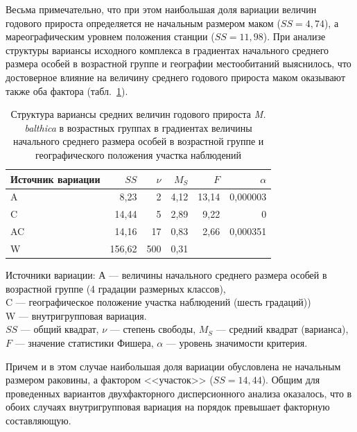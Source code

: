 Весьма примечательно, что при этом наибольшая доля вариации величин годового прироста определяется не начальным размером маком ($SS = 4,74$), а мареографическим уровнем положения станции ($SS = 11,98$).
При анализе структуры вариансы исходного комплекса в градиентах начального среднего размера особей в возрастной группе и географии местообитаний выяснилось, что достоверное влияние на величину среднего годового прироста маком оказывают также оба фактора (табл.~\ref{tab:prirost_ANOVA_geography}).
\begin{table}[hbp]
    \caption{Структура вариансы средних величин годового прироста {\it M. balthica} в возрастных группах в градиентах величины начального среднего размера особей в возрастной группе и географического положения участка наблюдений}
    \label{tab:prirost_ANOVA_geography}
    \begin{center}
    \begin{tabular}{|l|rrrrr|}
        \hline
    Источник вариации & $SS$   & $\nu$   & $M_S$   & $F$     & $\alpha$     \\ \hline
        A                 & 8,23   & 2   & 4,12 & 13,14 & 0,000003 \\
        C                 & 14,44  & 5   & 2,89 & 9,22  & 0        \\
        AC                & 14,16  & 17  & 0,83 & 2,66  & 0,000351 \\
        W                 & 156,62 & 500 & 0,31 &       &         \\ \hline
    \end{tabular}
\end{center}

    \footnotesize{Источники вариации: А --- величины начального среднего размера особей в возрастной группе (4 градации размерных классов),\\ 
        C --- географическое положение участка наблюдений (шесть градаций))\\
    W --- внутригрупповая вариация.\\
    $SS$ --- общий квадрат, $\nu$ --- степень свободы, $M_S$ --- средний квадрат (варианса), $F$ --- значение статистики Фишера, $\alpha$ --- уровень значимости критерия.}
\end{table}
Причем и в этом случае наибольшая доля вариации обусловлена не начальным размером раковины, а фактором <<участок>> ($SS = 14,44$).
Общим для проведенных вариантов двухфакторного дисперсионного анализа оказалось, что в обоих случаях внутригрупповая вариация на порядок превышает факторную составляющую. 
